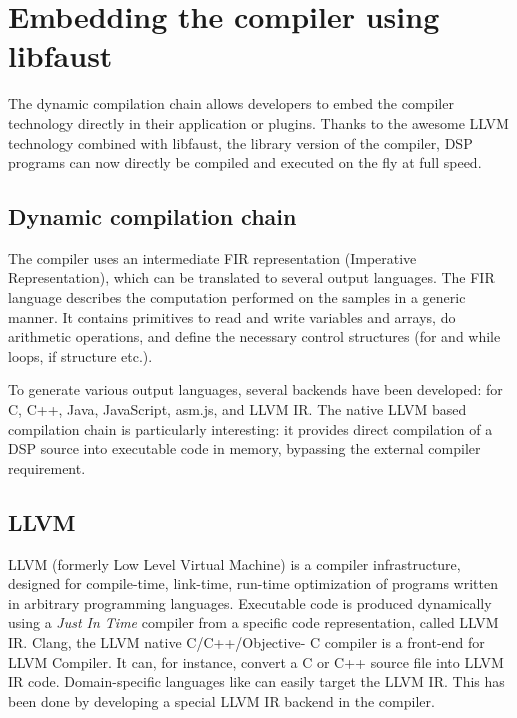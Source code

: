 \chapter{Embedding the \faust  compiler using libfaust} \label{sec:libfaust}

The dynamic compilation chain allows developers to embed the \faust compiler technology directly in their application or plugins. Thanks to the awesome LLVM technology combined with libfaust, the library version of the \faust compiler, \faust DSP programs can now directly be compiled and executed on the fly at full speed.

\section{Dynamic compilation chain}

The \faust compiler uses an intermediate FIR representation (\faust Imperative Representation), which can be translated to several output languages. The FIR language describes the computation performed on the samples in a generic manner. It contains primitives to read and write variables and arrays, do arithmetic operations, and define the necessary control structures (for and while loops, if structure etc.). 

To generate various output languages, several backends have been developed: for C, C++, Java, JavaScript, asm.js, and LLVM IR. The native LLVM based compilation chain is particularly interesting: it provides direct compilation of a DSP source into executable code in memory, bypassing the external compiler requirement.

\section{LLVM}

LLVM (formerly Low Level Virtual Machine) is a compiler infrastructure, designed for compile-time, link-time, run-time optimization of programs written in arbitrary programming languages. Executable code is produced dynamically using a {\it Just In Time} compiler from a specific code representation, called LLVM IR. Clang, the LLVM native C/C++/Objective- C compiler is a front-end for LLVM Compiler. It can, for instance, convert a C or C++ source file into LLVM IR code. Domain-specific languages like \faust can easily target the LLVM IR. This has been done by developing a special LLVM IR backend in the \faust compiler.

